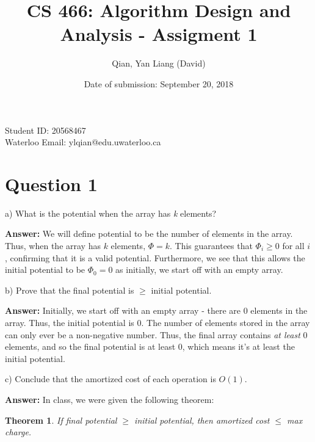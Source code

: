 \documentclass{article}
\title{CS 466: Algorithm Design and Analysis - Assigment 1}
\author{Qian, Yan Liang (David)}
\date{Date of submission: September 20, 2018}
\newtheorem{theorem}{Theorem}
\begin{document}
\maketitle

\begin{center}
\vspace{4.0cm}
\vspace{0.5cm}
Student ID: 20568467 \\
\vspace{0.5cm}
Waterloo Email: ylqian@edu.uwaterloo.ca \\
\vspace{5.0cm}
\end{center}

\newpage

\tableofcontents

\section{Question 1}

a) What is the potential when the array has \textit{k} elements?
\newline

\textbf{Answer:} We will define potential to be the number of elements in the array.
Thus, when the array has $k$ elements, $\Phi = k$.
This guarantees that $\Phi_i \geq 0$ for all $i$, confirming that it is a valid potential.
Furthermore, we see that this allows the initial potential to be $\Phi_0 = 0$ as initially, we start off with
an empty array.
\newline

b) Prove that the final potential is $\geq$ initial potential.
\newline

\textbf{Answer:} Initially, we start off with an empty array - there are 0 elements in the array. Thus, the initial
potential is 0.
The number of elements stored in the array can only ever be a non-negative number. Thus, the final array contains
\textit{at least} 0 elements, and so the final potential is at least 0, which means it's at least the initial potential.
\newline

c) Conclude that the amortized cost of each operation is $O(1)$.
\newline

\textbf{Answer:} In class, we were given the following theorem:

\begin{theorem}
    If final potential $\geq$ initial potential, then amortized cost $\leq$ max charge.
\end{theorem}
\end{document}
